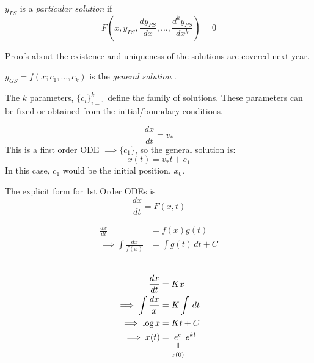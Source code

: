 \documentclass[10pt]{scrartcl}
\begin{document}



\begin{definition}
$y_{PS}$ is a \emph{particular solution} if 
\[F\left(x,y_{PS},\frac{dy_{PS}}{dx},\dots,\frac{d^ky_{PS}}{dx^k}\right)= 0\]
\end{definition}

Proofs about the existence and uniqueness of the solutions are covered next year.\\

\begin{definition}
$y_{GS} = f(x; c_1,\dots,c_k)$ is the \emph{general solution	}.

 The $k$ parameters, $\{c_i\}_{i=1}^k$ define the family of solutions. These parameters can be fixed or obtained from the initial/boundary conditions.
\end{definition}\vspace*{5pt}

\begin{example}[Velocity]
\[\frac{dx}{dt} = v_*\]
This is a first order ODE $\implies \{c_1\}$, so the general solution is:
\[x(t) = v_*t + c_1\]
In this case, $c_1$ would be the initial position, $x_0$. 
\end{example}



The explicit form for 1st Order ODEs is
\[\frac{dx}{dt} = F(x,t)\]

\[
\begin{aligned}
  \frac{dx}{dt} &= f(x)g(t)\\
  \implies \int \frac{dx}{f(x)} &= \int g(t)\,dt + C
\end{aligned}
\]~

\begin{example}
\[
\begin{aligned}
  \frac{dx}{dt} &= Kx\\
  \implies \int \frac{dx}{x} &= K\int\, dt\\
  \implies \log x &= Kt + C\\
  \implies x(t) &= \equalto{e^c}{x(0)}\,e^{kt}
\end{aligned}
\]
\end{example}
\end{document}
